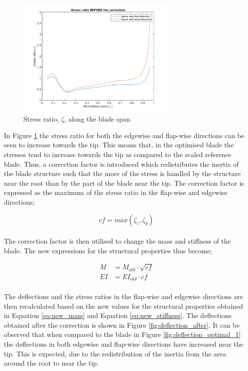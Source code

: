 \begin{figure}[H]
\centering
\includegraphics[width=0.7\textwidth]{Images/sigma_ratio_before.png} 
\caption{Stress ratio, $\zeta$, along the blade span  }\label{fig:stress_ratio_before}
\end{figure}

In Figure \ref{fig:stress_ratio_before} the stress ratio for both the edgewise and flap-wise directions can be seen to increase towards the tip. This means that, in the optimised blade the stresses tend to increase towards the tip as compared to the scaled reference blade. Thus, a correction factor is introduced which redistributes the inertia of the blade structure such that the more of the stress is handled by the structure near the root than by the part of the blade near the tip. The correction factor is expressed as the maximum of the stress ratio in the flap-wise and edgewise directions;

\begin{equation}
     cf = max(\zeta_{z},\zeta_{y})
\label{eq:correction_factor}
\end{equation}
\\
The correction factor is then utilised to change the mass and stiffness of the blade. The new expressions for the structural properties thus become;

\begin{align}
     M  &= M_{old} \cdot \sqrt{cf} \label{eq:new_mass} \\
     EI &= EI_{old} \cdot cf \label{eq:new_stiffness}
\end{align}
\\
The deflections and the stress ratios in the flap-wise and edgewise directions are then recalculated based on the new values for the structural properties obtained in Equation \ref{eq:new_mass} and Equation \ref{eq:new_stiffness}. The deflections obtained after the correction is shown in Figure \ref{fig:deflection_after}. It can be observed that when compared to the blade in Figure \ref{fig:deflection_optimal_1} the deflections in both edgewise and flap-wise directions have  increased near the tip. This is expected, due to the redistribution of the inertia from the area around the root to near the tip.

